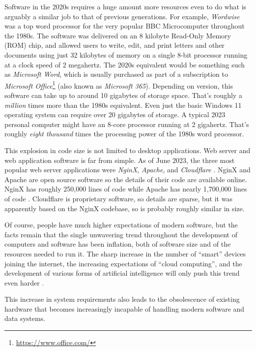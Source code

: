 \label{A20}
Software in the 2020s requires a huge amount more resources even to do what is arguably a similar job to that of previous generations. For example, \emph{Wordwise} \citep{Wordwise2023} was a top word processor for the very popular BBC Microcomputer throughout the 1980s. The software was delivered on an 8 kilobyte Read-Only Memory (ROM) chip, and allowed users to write, edit, and print letters and other documents using just 32 kilobytes of memory on a single 8-bit processor running at a clock speed of 2 megahertz. The 2020s equivalent would be something such as \emph{Microsoft Word}, which is usually purchased as part of a subscription to \emph{Microsoft Office}\footnote{\url{https://www.office.com/}} (also known as \emph{Microsoft 365}). Depending on version, this software can take up to around 10 gigabytes of storage space. That's roughly a \emph{million} times more than the 1980s equivalent. Even just the basic Windows 11 operating system can require over 20 gigabytes of storage. A typical 2023 personal computer might have an 8-core processor running at 2 gigahertz. That's roughly \emph{eight thousand} times the processing power of the 1980s word processor.

This explosion in code size is not limited to desktop applications. Web server and \gls{web application} software is far from simple. As of June 2023, the three most popular web server applications were \emph{NginX}, \emph{Apache}, and \emph{Cloudflare} \citep{Netcraft2023}. NginX and Apache are open source software so the details of their code are available online. NginX has roughly 250,000 lines of code \citep{Openhub2023a} while Apache has nearly 1,700,000 lines of code \citep{Openhub2023}. Cloudflare is proprietary software, so details are sparse, but it was apparently based on the NginX codebase, so is probably roughly similar in size.

Of course, people have much higher expectations of modern software, but the facts remain that the single unwavering trend throughout the development of computers and software has been inflation, both of software size and of the resources needed to run it. The sharp increase in the number of \enquote{smart} devices joining the internet, the increasing expectations of \enquote{\gls{cloud computing}}, and the development of various forms of \gls{artificial intelligence} will only push this trend even harder \citep{Falk2023}.

This increase in system requirements also leads to the obsolescence of existing hardware that becomes increasingly incapable of handling modern software and data systems.


